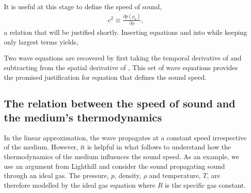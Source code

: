It is useful at this stage to define the speed of sound,
\begin{align}
  \label{eqn:csquaredApprox}
c^2 \equiv \frac{\partial p(\rho_0)}{\partial \rho},
\end{align}
a relation that will be justified shortly. %
%
Inserting equations  and  into 
while keeping only largest terms yields,

Two wave equations are recovered by first taking the temporal derivative of  and subtracting from the spatial derivative of
,
This set of wave equations provides the promised justification for equation  that defines the sound speed.

\subsection{The relation between the speed of sound and the medium's thermodynamics}
In the linear approximation, the wave propagates at a constant speed irrespective of the medium.
However, it is helpful in what follows to understand how the thermodynamics of the medium influences the sound speed.
As an example, we use an argument from Lighthill\cite{LighthillBook}
and consider the sound propagating sound through an ideal gas.
The pressure, $p$, density, $\rho$ and temperature, $T$, are therefore modelled by the ideal gas equation
where $R$ is the specific gas constant.


